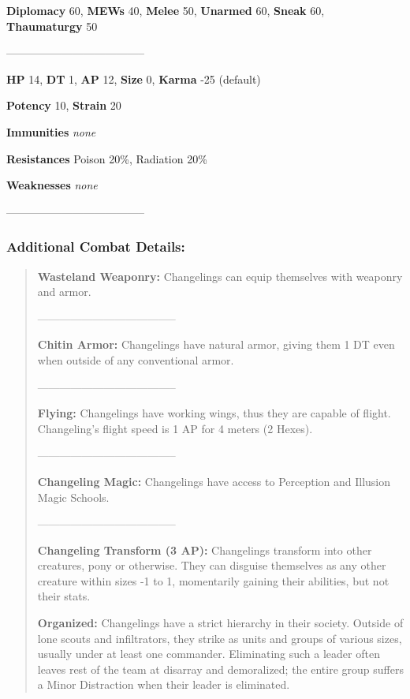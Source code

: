 \documentclass[11pt,a4paper,twocolumn]{book}
\begin{document}
		\noindent
		\textbf{Diplomacy} 60, \textbf{MEWs} 40, \textbf{Melee} 50, \textbf{Unarmed} 60, \textbf{Sneak} 60, \textbf{Thaumaturgy} 50
		
		--------------------------------------
		
		\noindent
		\textbf{HP} 14, \textbf{DT} 1, \textbf{AP} 12, \textbf{Size} 0, \textbf{Karma} -25 (default)
		
		\noindent
		\textbf{Potency} 10, \textbf{Strain} 20
		
		\noindent
		\textbf{Immunities} \emph{none}
		
		\noindent
		\textbf{Resistances} Poison 20\%, Radiation 20\%
		
		\noindent
		\textbf{Weaknesses} \emph{none} %
		
		--------------------------------------
	
	\subsubsection*{Additional Combat Details:}
	\begin{verse}		
		
		\textbf{Wasteland Weaponry:} Changelings can equip themselves with weaponry and armor.
		
		--------------------------------------
		
		\textbf{Chitin Armor:} Changelings have natural armor, giving them 1 DT even when outside of any conventional armor.
		
		--------------------------------------
		
		\textbf{Flying:} Changelings have working wings, thus they are capable of flight. Changeling's flight speed is 1 AP for 4 meters (2 Hexes). 
		
		--------------------------------------
			
		\textbf{Changeling Magic:} Changelings have access to Perception and Illusion Magic Schools.
		
		--------------------------------------		
		
		\textbf{Changeling Transform (3 AP):} Changelings transform into other creatures, pony or otherwise. They can disguise themselves as any other creature within sizes -1 to 1, momentarily gaining their abilities, but not their stats.
				
		\textbf{Organized:} Changelings have a strict hierarchy in their society. Outside of lone scouts and infiltrators, they strike as units and groups of various sizes, usually under at least one commander. Eliminating such a leader often leaves rest of the team at disarray and demoralized; the entire group suffers a Minor Distraction when their leader is eliminated.
		
	\end{verse}
	
\end{document}
